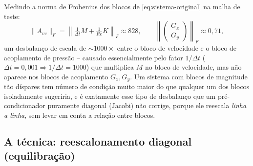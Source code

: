 \documentclass[11pt,a4paper]{article}
\begin{document}
Medindo a norma de Frobenius dos blocos de \eqref{eq:sistema-original}
na malha de teste:
\begin{equation}
  \|A_{vv}\|_F = \left\|\tfrac{1}{\Delta t}M + \tfrac{1}{Re}K\right\|_F
  \approx 828,
  \qquad
  \left\|\begin{pmatrix}G_x\\G_y\end{pmatrix}\right\|_F \approx 0{,}71,
\end{equation}
um desbalanço de escala de ${\sim}1000\times$ entre o bloco de
velocidade e o bloco de acoplamento de pressão -- causado
essencialmente pelo fator $1/\Delta t$ ($\Delta t = 0{,}001 \Rightarrow
1/\Delta t = 1000$) que multiplica $M$ no bloco de velocidade, mas não
aparece nos blocos de acoplamento $G_x, G_y$. Um sistema com blocos de
magnitude tão díspares tem número de condição muito maior do que
qualquer um dos blocos isoladamente sugeriria, e é exatamente esse
tipo de desbalanço que um pré-condicionador puramente diagonal (Jacobi)
não corrige, porque ele reescala \emph{linha a linha}, sem levar em
conta a relação entre blocos.

\subsection{A técnica: reescalonamento diagonal (equilibração)}
\end{document}

